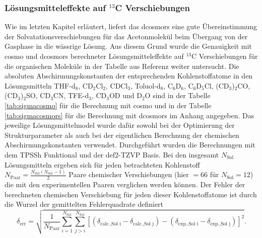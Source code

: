 	\subsubsection{Lösungsmitteleffekte auf \texorpdfstring{$^{13}$C}{13C} Verschiebungen}
	Wie im letzten Kapitel erläutert, liefert das \ac{dcosmors} eine gute Übereinstimmung der Solvatationsverschiebungen für das Acetonmolekül beim Übergang von der Gasphase in die wässrige Lösung. Aus diesem Grund wurde die Genauigkeit mit \ac{cosmo} und \ac{dcosmors} berechneter Lösungsmitteleffekte auf $^{13}$C Verschiebungen für die organischen Moleküle in der Tabelle aus Referenz \cite{fulmer2010nmr} weiter untersucht. Die absoluten Abschirmungskonstanten der entsprechenden Kohlenstoffatome in den Lösungsmitteln THF-d$_{8}$, CD$_{2}$Cl$_{2}$, CDCl$_{3}$, Toluol-d$_{8}$, C$_{6}$D$_{6}$, C$_{6}$D$_{5}$Cl, (CD$_{3}$)$_{2}$CO, (CD$_{3}$)$_{2}$SO, CD$_{3}$CN, TFE-d$_{3}$, CD$_{3}$OD und D$_{2}$O sind in der Tabelle \ref{tab:sigmacosmo} für die Berechnung mit \ac{cosmo} und in der Tabelle \ref{tab:sigmacosmors} für die Berechnung mit \ac{dcosmors} im Anhang angegeben. Das jeweilige Lösungsmittelmodel wurde dafür sowohl bei der Optimierung der Strukturparameter als auch bei der eigentlichen Berechnung der chemischen Abschirmungskonstanten verwendet. Durchgeführt wurden die Berechnungen mit dem TPSSh Funktional und der def2-TZVP Basis. Bei den insgesamt $N_{\textrm{Sol}}$ Lösungsmitteln ergeben sich für jeden betrachteten Kohlenstoff $N_{\textrm{Paar}}=\frac{N_{\textrm{Sol}}(N_{\textrm{Sol}}-1)}{2}$ Paare chemischer Verschiebungen (hier $=66$ für $N_{\textrm{Sol}}=12$) die mit den experimentellen Paaren verglichen werden können. Der Fehler der berechneten chemischen Verschiebung für jeden dieser Kohlenstoffatome ist durch die Wurzel der gemittelten Fehlerquadrate definiert
	\begin{equation}
	\delta_{\textrm{err}}=\sqrt{\frac{1}{N_{\textrm{Paar}}}\sum_{i=1}^{N_{\textrm{Sol}}}\sum_{j>i}^{N_{\textrm{Sol}}}\left[\left(\delta_{\textrm{calc.},{\textrm{Sol i}}}-\delta_{\textrm{calc.},{\textrm{Sol j}}}\right)-\left(\delta_{\textrm{exp.},{\textrm{Sol i}}}-\delta_{\textrm{exp.},{\textrm{Sol j}}}\right)\right]^2}.
	\end{equation}

